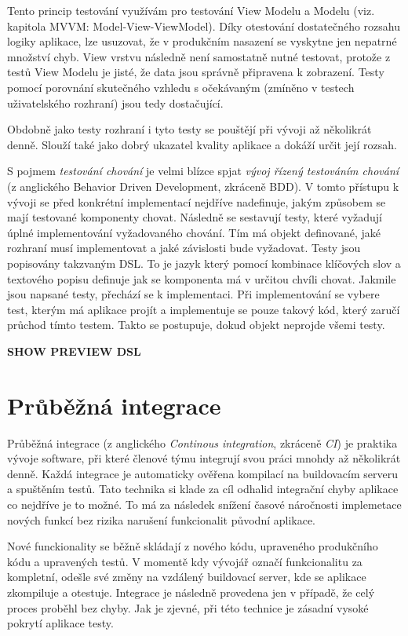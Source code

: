 Tento princip testování využívám pro testování View Modelu a Modelu (viz. kapitola MVVM: Model-View-ViewModel).
Díky otestování dostatečného rozsahu logiky aplikace, lze usuzovat, že v produkčním nasazení se vyskytne jen nepatrné množství chyb.
View vrstvu následně není samostatně nutné testovat, protože z testů View Modelu je jisté, že data jsou správně připravena k zobrazení.
Testy pomocí porovnání skutečného vzhledu s očekávaným (zmíněno v testech uživatelského rozhraní) jsou tedy dostačující.

Obdobně jako testy rozhraní i tyto testy se pouštějí při vývoji až několikrát denně.
Slouží také jako dobrý ukazatel kvality aplikace a dokáží určit její rozsah.

S pojmem \textit{testování chování} je velmi blízce spjat \textit{vývoj řízený testováním chování} (z anglického Behavior Driven Development, zkráceně BDD).
V tomto přístupu k vývoji se před konkrétní implementací nejdříve nadefinuje, jakým způsobem se mají testované komponenty chovat.
Následně se sestavují testy, které vyžadují úplné implementování vyžadovaného chování.
Tím má objekt definované, jaké rozhraní musí implementovat a jaké závislosti bude vyžadovat.
Testy jsou popisovány takzvaným DSL.
To je jazyk který pomocí kombinace klíčových slov a textového popisu definuje jak se komponenta má v určitou chvíli chovat.
Jakmile jsou napsané testy, přechází se k implementaci.
Při implementování se vybere test, kterým má aplikace projít a implementuje se pouze takový kód, který zaručí průchod tímto testem.
Takto se postupuje, dokud objekt neprojde všemi testy. \cite{objcio-bdd}

\textbf{SHOW PREVIEW DSL}

\section{Průběžná integrace}

Průběžná integrace (z anglického \textit{Continous integration}, zkráceně \textit{CI}) je praktika vývoje software, při které členové týmu integrují svou práci mnohdy až několikrát denně.
Každá integrace je automaticky ověřena kompilací na buildovacím serveru a spuštěním testů.
Tato technika si klade za cíl odhalid integrační chyby aplikace co nejdříve je to možné.
To má za následek snížení časové náročnosti implemetace nových funkcí bez rizika narušení funkcionalit původní aplikace.

Nové funckionality se běžně skládají z nového kódu, upraveného produkčního kódu a upravených testů.
V momentě kdy vývojář označí funkcionalitu za kompletní, odešle své změny na vzdálený buildovací server, kde se aplikace zkompiluje a otestuje.
Integrace je následně provedena jen v případě, že celý proces proběhl bez chyby.
Jak je zjevné, při této technice je zásadní vysoké pokrytí aplikace testy.

